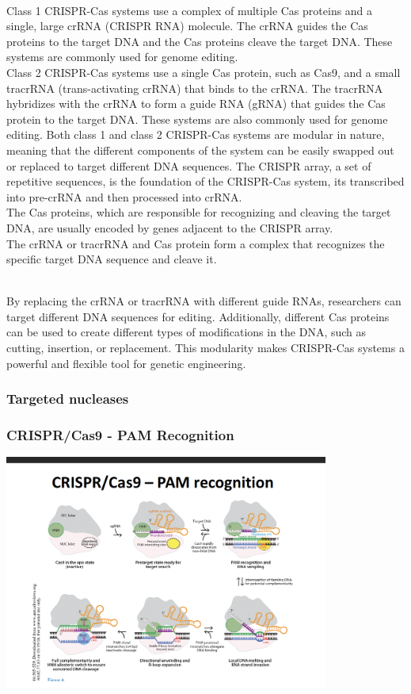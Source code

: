 \begin{itemize}
\begin{itemize}
\\Class 1 CRISPR-Cas systems use a complex of multiple Cas proteins and a single, large crRNA (CRISPR RNA) molecule. The crRNA guides the Cas proteins to the target DNA and the Cas proteins cleave the target DNA. These systems are commonly used for genome editing.
\\Class 2 CRISPR-Cas systems use a single Cas protein, such as Cas9, and a small tracrRNA (trans-activating crRNA) that binds to the crRNA. The tracrRNA hybridizes with the crRNA to form a guide RNA (gRNA) that guides the Cas protein to the target DNA. These systems are also commonly used for genome editing.
Both class 1 and class 2 CRISPR-Cas systems are modular in nature, meaning that the different components of the system can be easily swapped out or replaced to target different DNA sequences.
The CRISPR array, a set of repetitive sequences, is the foundation of the CRISPR-Cas system, its transcribed into pre-crRNA and then processed into crRNA.
\\The Cas proteins, which are responsible for recognizing and cleaving the target DNA, are usually encoded by genes adjacent to the CRISPR array.
\\The crRNA or tracrRNA and Cas protein form a complex that recognizes the specific target DNA sequence and cleave it.

\\By replacing the crRNA or tracrRNA with different guide RNAs, researchers can target different DNA sequences for editing. Additionally, different Cas proteins can be used to create different types of modifications in the DNA, such as cutting, insertion, or replacement. This modularity makes CRISPR-Cas systems a powerful and flexible tool for genetic engineering.
\subsubsection{Targeted nucleases}

\subsubsection{CRISPR/Cas9 - PAM Recognition}
\includegraphics[width=0.8\textwidth]{Images/PAMREC.png}\\[1cm]


\end{itemize}
\end{itemize}
